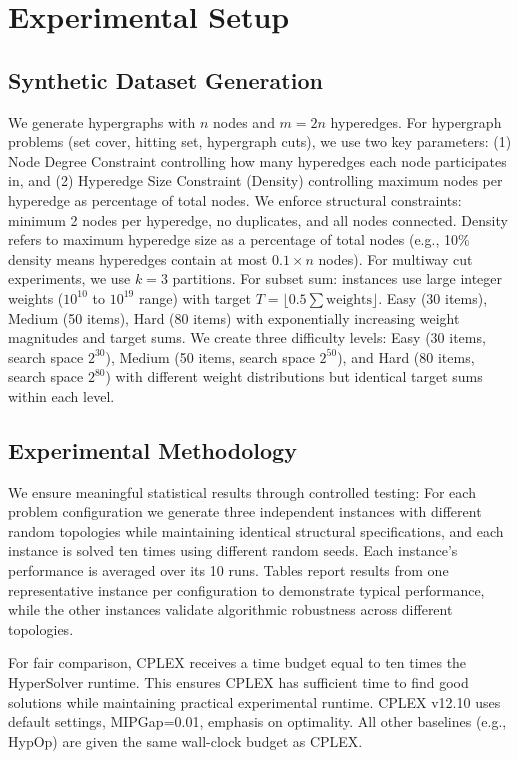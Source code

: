 \documentclass[conference]{IEEEtran}
\begin{document}
\section{Experimental Setup}

\subsection{Synthetic Dataset Generation}
We generate hypergraphs with \(n\) nodes and \(m = 2n\) hyperedges. For hypergraph problems (set cover, hitting set, hypergraph cuts), we use two key parameters: (1) Node Degree Constraint controlling how many hyperedges each node participates in, and (2) Hyperedge Size Constraint (Density) controlling maximum nodes per hyperedge as percentage of total nodes. We enforce structural constraints: minimum 2 nodes per hyperedge, no duplicates, and all nodes connected. Density refers to maximum hyperedge size as a percentage of total nodes (e.g., 10\% density means hyperedges contain at most \(0.1 \times n\) nodes). For multiway cut experiments, we use \(k=3\) partitions. For subset sum: instances use large integer weights (\(10^{10}\) to \(10^{19}\) range) with target \(T = \lfloor 0.5\sum\text{weights}\rfloor\). Easy (30 items), Medium (50 items), Hard (80 items) with exponentially increasing weight magnitudes and target sums. We create three difficulty levels: Easy (30 items, search space \(2^{30}\)), Medium (50 items, search space \(2^{50}\)), and Hard (80 items, search space \(2^{80}\)) with different weight distributions but identical target sums within each level.

\subsection{Experimental Methodology}
We ensure meaningful statistical results through controlled testing: For each problem configuration we generate three independent instances with different random topologies while maintaining identical structural specifications, and each instance is solved ten times using different random seeds. Each instance's performance is averaged over its 10 runs. Tables report results from one representative instance per configuration to demonstrate typical performance, while the other instances validate algorithmic robustness across different topologies.

For fair comparison, CPLEX receives a time budget equal to ten times the HyperSolver runtime. This ensures CPLEX has sufficient time to find good solutions while maintaining practical experimental runtime. CPLEX v12.10 uses default settings, MIPGap=0.01, emphasis on optimality. All other baselines (e.g., HypOp) are given the same wall-clock budget as CPLEX.
\end{document}
